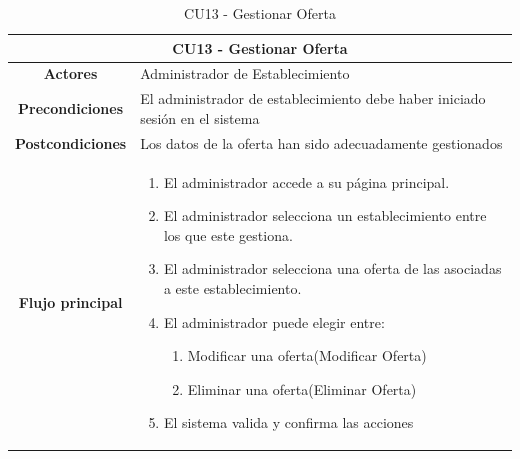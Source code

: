 \begin{table}[h]
    \centering
    \begin{tabular}{|c|p{10cm}|}
        \hline
        \multicolumn{2}{|c|}{\textbf{CU13 - Gestionar Oferta}}                                                          \\
        \hline
        \textbf{Actores}         & Administrador de Establecimiento                                                     \\
        \hline
        \textbf{Precondiciones}  & El administrador de establecimiento debe haber iniciado sesión en el sistema         \\
        \hline
        \textbf{Postcondiciones} & Los datos de la oferta han sido adecuadamente gestionados                            \\
        \hline
        \textbf{Flujo principal} & \begin{enumerate}
                                       \item El administrador accede a su página principal.
                                       \item El administrador selecciona un establecimiento entre los que este gestiona.
                                       \item El administrador selecciona una oferta de las asociadas a este establecimiento.
                                       \item El administrador puede elegir entre:
                                             \begin{enumerate}
                      \item Modificar una oferta(Modificar Oferta)
                      \item Eliminar una oferta(Eliminar Oferta)
                  \end{enumerate}
                                       \item El sistema valida y confirma las acciones
                                   \end{enumerate} \\
        \hline
    \end{tabular}
    \caption{CU13 - Gestionar Oferta }
\end{table}

